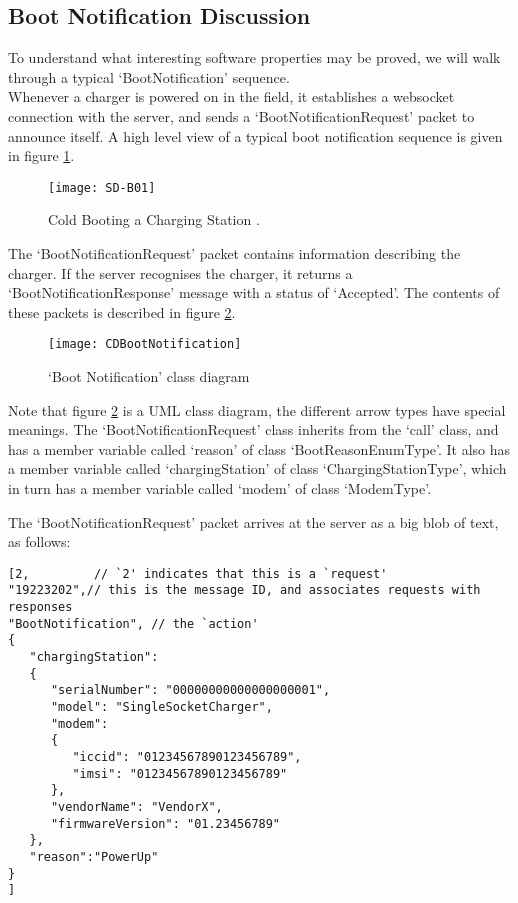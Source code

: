 \documentclass[12pt,openany,a4paper]{book}
\begin{document}
\subsection{Boot Notification Discussion}
To understand what interesting software properties may be proved, we will walk through a typical `BootNotification' sequence.\\

Whenever a charger is powered on in the field, it establishes a websocket connection with the server, and sends a `BootNotificationRequest' packet to announce itself. A high level view of a typical boot notification sequence is given in figure \ref{fig:SD-B01}.

	\begin{center}
		\begin{figure}[H]
			\texttt{[image: SD-B01]}
			\caption{Cold Booting a Charging Station \cite{ocpp2b}.}
			\label{fig:SD-B01}
		\end{figure}
	\end{center}
	
The `BootNotificationRequest' packet contains information describing the charger. If the server recognises the charger, it returns a `BootNotificationResponse' message with a status of `Accepted'. The contents of these packets is described in figure \ref{fig:CDBootNotification}.

	\begin{center}
		\begin{figure}[H]
			\texttt{[image: CDBootNotification]}
			\caption{`Boot Notification' class diagram}
			\label{fig:CDBootNotification}
		\end{figure}
	\end{center}
	
Note that figure \ref{fig:CDBootNotification} is a UML class diagram, the different arrow types have special meanings. The `BootNotificationRequest' class inherits from the `call' class, and has a member variable called `reason' of class `BootReasonEnumType'. It also has a member variable called `chargingStation' of class `ChargingStationType', which in turn has a member variable called `modem' of class `ModemType'.

\pagebreak
The `BootNotificationRequest' packet arrives at the server as a big blob of text, as follows:
\begin{verbatim}
[2,	        // `2' indicates that this is a `request'
"19223202",// this is the message ID, and associates requests with responses
"BootNotification", // the `action'
{
   "chargingStation":
   {
      "serialNumber": "00000000000000000001",
      "model": "SingleSocketCharger",
      "modem":
      {
         "iccid": "01234567890123456789",
         "imsi": "01234567890123456789"
      },
      "vendorName": "VendorX",
      "firmwareVersion": "01.23456789"
   },
   "reason":"PowerUp"
}
]
\end{verbatim}
\end{document}

